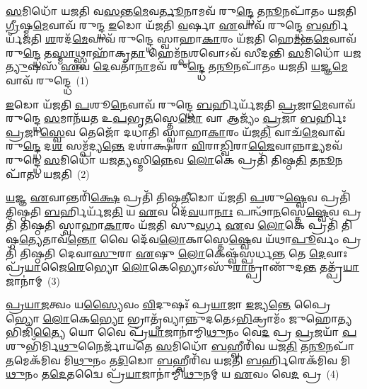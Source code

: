 \setcounter{anuvakam}{0}
\-\ul{𑌸}\-𑌮𑌿𑌧𑍋᳴ 𑌯𑌜𑌤𑌿 𑌵\-\ul{𑌸}\-𑌨𑍍𑌤\-\ul{𑌮𑍇}\-𑌵\-\ul{𑌰𑍍𑌤𑍂}\-𑌨𑌾𑌮𑌵᳴ 𑌰𑍁\-\ul{𑌨𑍍𑌦𑍍𑌧𑍇} 𑌤\-\ul{𑌨𑍂}\-𑌨𑌪𑌾᳴𑌤𑌂 𑌯𑌜𑌤𑌿 \ul{𑌗𑍍𑌰𑍀}\-𑌷𑍍𑌮\-\ul{𑌮𑍇}\-𑌵𑌾𑌵᳴ 𑌰𑍁𑌨𑍍𑌦𑍍𑌧 \ul{𑌇}\-𑌡𑍋 𑌯᳴𑌜𑌤𑌿 \ul{𑌵}\-𑌰𑍍\mbox{}𑌷𑌾 \ul{𑌏}\-𑌵𑌾𑌵᳴ 𑌰𑍁𑌨𑍍𑌦𑍍𑌧𑍇 \ul{𑌬}\-𑌰𑍍\mbox{}𑌹𑌿𑌰𑍍𑌯᳴𑌜𑌤𑌿 \ul{𑌶}\-𑌰𑌦᳴\-\ul{𑌮𑍇}\-𑌵𑌾𑌵᳴ 𑌰𑍁𑌨𑍍𑌦𑍍𑌧𑍇 𑌸𑍍𑌵𑌾𑌹𑌾\-\ul{𑌕𑌾}\-𑌰𑌂 𑌯᳴𑌜𑌤𑌿 𑌹𑍇\-\ul{𑌮}\-𑌨𑍍𑌤\-\ul{𑌮𑍇}\-𑌵𑌾𑌵᳴ 𑌰𑍁\-\ul{𑌨𑍍𑌦𑍍𑌧𑍇} 𑌤\-\ul{𑌸𑍍𑌮𑌾}\-𑌥𑍍𑌸𑍍𑌵𑌾𑌹𑌾᳴𑌕𑍃\-\ul{𑌤𑌾} 𑌹𑍇𑌮᳴\-\ul{𑌨𑍍𑌪}\-𑌶𑌵𑍋\-𑌽𑌵᳴ 𑌸𑍀𑌦𑌨𑍍𑌤𑌿 \ul{𑌸}\-𑌮𑌿𑌧𑍋᳴ 𑌯𑌜\-\ul{𑌤𑍍𑌯𑍁}\-𑌷𑌸᳴ \ul{𑌏}\-𑌵 \ul{𑌦𑍇}\-𑌵𑌤𑌾᳴\-\ul{𑌨𑌾}\-𑌮𑌵᳴ 𑌰𑍁\-\ul{𑌨𑍍𑌦𑍍𑌧𑍇} 𑌤\-\ul{𑌨𑍂}\-𑌨𑌪𑌾᳴𑌤𑌂 𑌯𑌜𑌤𑌿 \ul{𑌯}\-𑌜𑍍𑌞\-\ul{𑌮𑍇}\-𑌵𑌾𑌵᳴ 𑌰𑍁𑌨𑍍𑌦𑍍𑌧𑍇~(1)

\-\ul{𑌇}\-𑌡𑍋 𑌯᳴𑌜𑌤𑌿 \ul{𑌪}\-𑌶𑍂\-\ul{𑌨𑍇}\-𑌵𑌾𑌵᳴ 𑌰𑍁𑌨𑍍𑌦𑍍𑌧𑍇 \ul{𑌬}\-𑌰𑍍\mbox{}𑌹𑌿𑌰𑍍𑌯᳴𑌜𑌤𑌿 \ul{𑌪𑍍𑌰}\-𑌜𑌾\-\ul{𑌮𑍇}\-𑌵𑌾𑌵᳴ 𑌰𑍁𑌨𑍍𑌦𑍍𑌧𑍇 \ul{𑌸}\-𑌮𑌾𑌨᳴𑌯𑌤 𑌉\-\ul{𑌪}\-𑌭𑍃\-\ul{𑌤}\-𑌸𑍍𑌤𑍇\-\ul{𑌜𑍋} 𑌵𑌾 𑌆𑌜𑍍𑌯𑌂᳴ \ul{𑌪𑍍𑌰}\-𑌜𑌾 \ul{𑌬}\-𑌰𑍍\mbox{}𑌹𑌿𑌃 \ul{𑌪𑍍𑌰}\-𑌜𑌾\-\ul{𑌸𑍍𑌵𑍇}\-𑌵 𑌤𑍇𑌜𑍋᳴ 𑌦𑌧𑌾𑌤𑌿 𑌸𑍍𑌵𑌾𑌹𑌾\-\ul{𑌕𑌾}\-𑌰𑌂 𑌯᳴𑌜\-\ul{𑌤𑌿} 𑌵𑌾𑌚᳴\-\ul{𑌮𑍇}\-𑌵𑌾𑌵᳴ 𑌰𑍁\-\ul{𑌨𑍍𑌦𑍍𑌧𑍇} 𑌦\-\ul{𑌶} 𑌸𑌮𑍍𑌪᳴𑌦𑍍𑌯\-\ul{𑌨𑍍𑌤𑍇} 𑌦𑌶𑌾॑𑌕𑍍𑌷𑌰𑌾 \ul{𑌵𑌿}\-𑌰𑌾\-\ul{𑌡𑍍𑌵𑌿}\-𑌰𑌾\-\ul{𑌜𑍈}\-𑌵𑌾𑌨𑍍𑌨𑌾\-\ul{𑌦𑍍𑌯}\-𑌮𑌵᳴ 𑌰𑍁𑌨𑍍𑌦𑍍𑌧𑍇 \ul{𑌸}\-𑌮𑌿𑌧𑍋᳴ 𑌯𑌜\-\ul{𑌤𑍍𑌯}\-𑌸𑍍𑌮𑌿\-\ul{𑌨𑍍𑌨𑍇}\-𑌵 \ul{𑌲𑍋}\-𑌕𑍇 𑌪𑍍𑌰𑌤𑌿᳴ 𑌤𑌿𑌷𑍍𑌠\-\ul{𑌤𑌿} 𑌤\-\ul{𑌨𑍂}\-𑌨𑌪𑌾᳴𑌤𑌂 𑌯𑌜𑌤𑌿~(2)

\-\ul{𑌯}\-𑌜𑍍𑌞 \ul{𑌏}\-𑌵𑌾𑌨𑍍𑌤𑌰𑌿᳴\-\ul{𑌕𑍍𑌷𑍇} 𑌪𑍍𑌰𑌤𑌿᳴ 𑌤𑌿𑌷𑍍𑌠\-\ul{𑌤𑍀}\-𑌡𑍋 𑌯᳴𑌜𑌤𑌿 \ul{𑌪}\-𑌶𑍁\-\ul{𑌷𑍍𑌵𑍇}\-𑌵 𑌪𑍍𑌰𑌤𑌿᳴ 𑌤𑌿𑌷𑍍𑌠𑌤𑌿 \ul{𑌬}\-𑌰𑍍\mbox{}𑌹𑌿𑌰𑍍𑌯᳴𑌜\-\ul{𑌤𑌿} 𑌯 \ul{𑌏}\-𑌵 𑌦𑍇᳴\-\ul{𑌵}\-𑌯𑌾\-\ul{𑌨𑌾𑌃} 𑌪𑌨𑍍𑌥𑌾᳴\-\ul{𑌨}\-𑌸𑍍𑌤𑍇\-\ul{𑌷𑍍𑌵𑍇}\-𑌵 𑌪𑍍𑌰𑌤𑌿᳴ 𑌤𑌿𑌷𑍍𑌠𑌤𑌿 𑌸𑍍𑌵𑌾𑌹𑌾\-\ul{𑌕𑌾}\-𑌰𑌂 𑌯᳴𑌜𑌤𑌿 𑌸𑍁\-\ul{𑌵}\-𑌰𑍍𑌗 \ul{𑌏}\-𑌵 \ul{𑌲𑍋}\-𑌕𑍇 𑌪𑍍𑌰𑌤𑌿᳴ 𑌤𑌿𑌷𑍍𑌠\-\ul{𑌤𑍍𑌯𑍇}\-𑌤𑌾𑌵᳴\-\ul{𑌨𑍍𑌤𑍋} 𑌵𑍈 𑌦𑍇᳴𑌵\-\ul{𑌲𑍋}\-𑌕𑌾𑌸𑍍𑌤𑍇\-\ul{𑌷𑍍𑌵𑍇}\-𑌵 𑌯᳴𑌥𑌾\-\ul{𑌪𑍂}\-𑌰𑍍𑌵𑌂 𑌪𑍍𑌰𑌤𑌿᳴ 𑌤𑌿𑌷𑍍𑌠𑌤𑌿 𑌦𑍇𑌵𑌾\-\ul{𑌸𑍁}\-𑌰𑌾 \ul{𑌏}\-𑌷𑍁 \ul{𑌲𑍋}\-𑌕𑍇𑌷𑍍𑌵᳴𑌸𑍍𑌪𑌰𑍍𑌧\-\ul{𑌨𑍍𑌤} 𑌤𑍇 \ul{𑌦𑍇}\-𑌵𑌾𑌃 𑌪𑍍𑌰᳴\-\ul{𑌯𑌾}\-𑌜𑍈\-\ul{𑌰𑍇}\-𑌭𑍍𑌯𑍋 \ul{𑌲𑍋}\-𑌕𑍇𑌭𑍍𑌯𑍋\-𑌽𑌸𑍁᳴\-\ul{𑌰𑌾}\-𑌨𑍍𑌪𑍍𑌰𑌾𑌣𑍁᳴𑌦\-\ul{𑌨𑍍𑌤} 𑌤𑌤𑍍𑌪𑍍𑌰᳴\-\ul{𑌯𑌾}\-𑌜𑌾𑌨𑌾॑𑌮𑍍~(3)

\-\ul{𑌪𑍍𑌰}\-\-\ul{𑌯𑌾}\-\-\ul{𑌜}\-𑌤𑍍𑌵𑌂 𑌯\-\ul{𑌸𑍍𑌯𑍈}\-𑌵𑌂 \ul{𑌵𑌿}\-𑌦𑍁𑌷𑌃᳴ 𑌪𑍍𑌰\-\ul{𑌯𑌾}\-𑌜𑌾 \ul{𑌇}\-𑌜𑍍𑌯\-\ul{𑌨𑍍𑌤𑍇} 𑌪𑍍𑌰𑍈𑌭𑍍𑌯𑍋 \ul{𑌲𑍋}\-𑌕𑍇\-\ul{𑌭𑍍𑌯𑍋} 𑌭𑍍𑌰𑌾𑌤𑍃᳴𑌵𑍍𑌯𑌾𑌨𑍍𑌨𑍁𑌦𑌤𑍇\-𑌽\-\ul{𑌭𑌿}\-𑌕𑍍𑌰𑌾𑌮𑌂᳴ 𑌜𑍁𑌹𑍋\-\ul{𑌤𑍍𑌯}\-𑌭𑌿𑌜𑌿᳴\-\ul{𑌤𑍍𑌯𑍈} 𑌯𑍋 𑌵𑍈 𑌪𑍍𑌰᳴\-\ul{𑌯𑌾}\-𑌜𑌾𑌨𑌾॑𑌮𑍍𑌮𑌿\-\ul{𑌥𑍁}\-𑌨𑌂 𑌵𑍇\-\ul{𑌦} 𑌪𑍍𑌰 \ul{𑌪𑍍𑌰}\-𑌜𑌯𑌾᳴ \ul{𑌪}\-𑌶𑍁𑌭𑌿᳴𑌰𑍍𑌮𑌿\-\ul{𑌥𑍁}\-𑌨𑍈𑌰𑍍𑌜𑌾᳴𑌯𑌤𑍇 \ul{𑌸}\-𑌮𑌿𑌧𑍋᳴ \ul{𑌬}\-𑌹𑍍𑌵𑍀𑌰𑌿᳴𑌵 𑌯𑌜\-\ul{𑌤𑌿} 𑌤\-\ul{𑌨𑍂}\-𑌨𑌪𑌾᳴\-\ul{𑌤}\-𑌮𑍇𑌕᳴𑌮𑌿𑌵 𑌮𑌿\-\ul{𑌥𑍁}\-𑌨𑌂 𑌤\-\ul{𑌦𑌿}\-𑌡𑍋 \ul{𑌬}\-𑌹𑍍𑌵𑍀𑌰𑌿᳴𑌵 𑌯𑌜𑌤𑌿 \ul{𑌬}\-𑌰𑍍\mbox{}𑌹𑌿𑌰𑍇𑌕᳴𑌮𑌿𑌵 𑌮𑌿\-\ul{𑌥𑍁}\-𑌨𑌂 𑌤\-\ul{𑌦𑍇}\-𑌤𑌦𑍍𑌵𑍈 𑌪𑍍𑌰᳴\-\ul{𑌯𑌾}\-𑌜𑌾𑌨𑌾॑𑌮𑍍𑌮𑌿\-\ul{𑌥𑍁}\-𑌨𑌮𑍍 𑌯 \ul{𑌏}\-𑌵𑌂 𑌵𑍇\-\ul{𑌦} 𑌪𑍍𑌰~(4)

